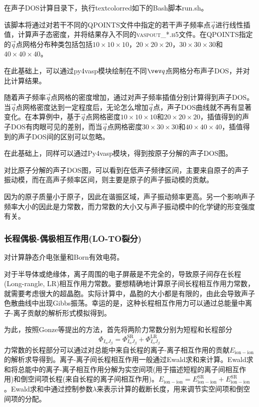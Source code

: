 在声子\textrm{DOS}计算目录下，执行textcolor{red}{如下的}\textrm{Bash}脚本\textrm{run.sh}。

该脚本将通过对若干不同的\textrm{QPOINTS}文件中指定的若干声子频率点$\vec q$进行线性插值，计算声子态密度，并将结果存入不同的\textsc{vaspout\_*.h5}文件。在\textrm{QPOINTS}指定的$\vec q$点网格分布种类包括包括$10\times10\times10$，$20\times20\times20$，$30\times30\times30$和$40\times40\times40$。

在此基础上，可以通过\textrm{py4vasp}模块绘制在不同$\vev q$点网格分布声子\textrm{DOS}，并对比计算结果。

随着声子频率$\vec q$点网格的密度增加，通过对声子频率插值分别计算得到声子\textrm{DOS}。当$\vec q$点网格密度达到一定程度后，无论怎么增加$\vec q$点，声子\textrm{DOS}曲线就不再有显著变化。在本算例中，基于$\vec q$点网格密度$10\times10\times10$和$20\times20\times20$，插值得到的声子\textrm{DOS}有肉眼可见的差别，而当$\vec q$点网格密度$30\times30\times30$和$40\times40\times40$，插值得到的声子\textrm{DOS}间的区别可以忽略。%

在此基础上，同样可以通过\textrm{Py4vasp}模块，得到按原子分解的声子\textrm{DOS}图。

对比原子分解的声子\textrm{DOS}图，可以看到在低声子频律区间，主要来自原子的声子振动模，而在高声子频率区间，则主要是原子的声子振动模的贡献。

因为的原子质量小于原子，因此在谐振区域，声子振动频率更高。另一个影响声子频率大小的因此是力常数，而力常数的大小又与声子振动模中的化学键的形变强度有关。

\subsubsection{长程偶极-偶极相互作用(\rm{LO-TO}裂分)}
对计算静态介电张量和\textrm{Born}有效电荷。

对于半导体或绝缘体，离子周围的电子屏蔽是不完全的，导致原子间存在长程\textrm{(Long-rangle, LR)}相互作用力常数。要想精确地计算原子间长程相互作用力常数，就需要考虑很大的超晶胞。实际计算中，晶胞的大小都是有限的，由此会导致声子色散曲线中出现\textrm{Gibbs}振荡。幸运的是，这种长程相互作用力可以通过总能量中离子-离子贡献的解析形式模拟得到。

为此，按照\textrm{Gonze}等提出的方法，首先将两阶力常数分别为短程和长程部分
\begin{displaymath}
	\Phi_{I_{\alpha}J_{\beta}}=\Phi_{I_{\alpha}J_{\beta}}^{\mathrm{SR}}+\Phi_{I_{\alpha}J_{\beta}}^{\mathrm{LR}}
\end{displaymath}
力常数的长程部分可以通过对总能中来自长程的离子-离子相互作用的贡献$E_{\mathrm{ion-ion}}$的解析求导得到。离子-离子间长程相互作用一般通过\textrm{Ewald}求和来计算。\textrm{Ewald}求和将总能中的离子-离子相互作用分解为实空间项(用于描述短程的离子间相互作用)和倒空间项长程(来自长程的离子间相互作用)。$E_{\mathrm{ion-ion}}=E_{\mathrm{ion-ion}}^{\mathrm{SR}}+E_{\mathrm{ion-ion}}^{\mathrm{SR}}$。\textrm{Ewald}求和中通过控制参数$\lambda$来表示计算的截断长度，用来调节实空间项和倒空间项的分配。


